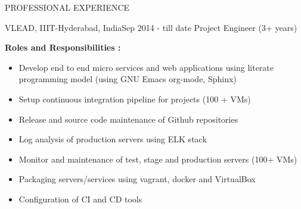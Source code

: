 \documentclass{resume} %
\begin{document}
\begin{rSection}{PROFESSIONAL EXPERIENCE}
  
  \begin{rSubsection}
    {VLEAD, IIIT-Hyderabad, India}{Sep 2014 - till date}
    {Project Engineer} {(3+ years)}

    \textbf{Roles and Responsibilities :}

    \begin{itemize}
      
    \item Develop end to end micro services and web
      applications using literate programming model (using
      GNU Emacs org-mode, Sphinx)

    \item Setup continuous integration pipeline for projects
      (100 + VMs)

    \item Release and source code maintenance of Github
      repositories

    \item Log analysis of production servers using ELK stack      
      
    \item Monitor and maintenance of test, stage and production
      servers (100+ VMs)
      
    \item Packaging servers/services using vagrant,
      docker and VirtualBox

    \item Configuration of CI and CD tools
      

\end{itemize}
\end{rSubsection}
\end{rSection}
\end{document}
